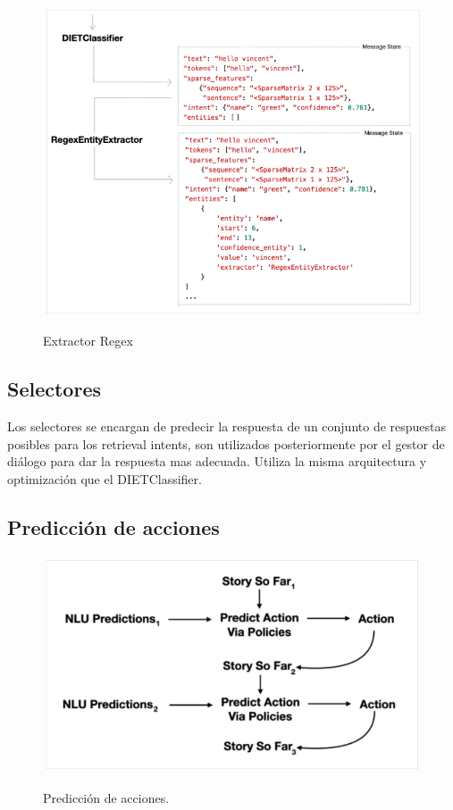 \begin{figure}[h]
	\centering
	\includegraphics[width=\textwidth]{imagenes/cap3/regex_extractor.png}
	\caption{Extractor Regex}
	\label{fig:regex-extractor}
	\cite{Rasa}
\end{figure}

\subsection{Selectores}
Los selectores se encargan de predecir la respuesta de un conjunto de respuestas posibles para los
retrieval intents, son utilizados posteriormente por el gestor de diálogo para dar la respuesta mas
adecuada.
Utiliza la misma arquitectura y optimización que el DIETClassifier.

\subsection{Predicción de acciones}
\begin{figure}[h!]
	\centering
	\includegraphics[width=\textwidth]{imagenes/cap3/predicciones.png}
	\caption{Predicción de acciones.}
	\label{fig:regex-extractor}
	\cite{Rasa}
\end{figure}

